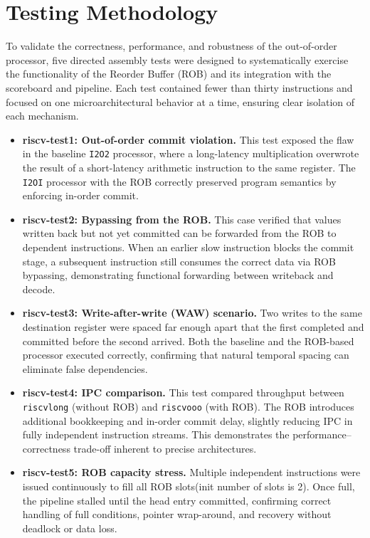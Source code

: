 \documentclass[11pt,a4paper]{article}
\begin{document}
\section{Testing Methodology}

To validate the correctness, performance, and robustness of the out-of-order processor, five directed assembly tests were designed to systematically exercise the functionality of the Reorder Buffer (ROB) and its integration with the scoreboard and pipeline. Each test contained fewer than thirty instructions and focused on one microarchitectural behavior at a time, ensuring clear isolation of each mechanism.

\begin{itemize}
  \item \textbf{riscv-test1: Out-of-order commit violation.}  
  This test exposed the flaw in the baseline \texttt{I2O2} processor, where a long-latency multiplication overwrote the result of a short-latency arithmetic instruction to the same register. The \texttt{I2OI} processor with the ROB correctly preserved program semantics by enforcing in-order commit.

  \item \textbf{riscv-test2: Bypassing from the ROB.}  
  This case verified that values written back but not yet committed can be forwarded from the ROB to dependent instructions. When an earlier slow instruction blocks the commit stage, a subsequent instruction still consumes the correct data via ROB bypassing, demonstrating functional forwarding between writeback and decode.

  \item \textbf{riscv-test3: Write-after-write (WAW) scenario.}  
  Two writes to the same destination register were spaced far enough apart that the first completed and committed before the second arrived. Both the baseline and the ROB-based processor executed correctly, confirming that natural temporal spacing can eliminate false dependencies.

  \item \textbf{riscv-test4: IPC comparison.}  
  This test compared throughput between \texttt{riscvlong} (without ROB) and \texttt{riscvooo} (with ROB). The ROB introduces additional bookkeeping and in-order commit delay, slightly reducing IPC in fully independent instruction streams. This demonstrates the performance–correctness trade-off inherent to precise architectures.

  \item \textbf{riscv-test5: ROB capacity stress.}  
  Multiple independent instructions were issued continuously to fill all ROB slots(init number of slots is 2). Once full, the pipeline stalled until the head entry committed, confirming correct handling of full conditions, pointer wrap-around, and recovery without deadlock or data loss.
\end{itemize}
\end{document}
